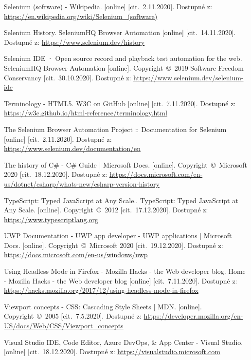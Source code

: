 \begin{thebibliography}{99}
 Selenium (software) - Wikipedia. [online] [cit.~2.11.2020]. Dostupné z: \url{https://en.wikipedia.org/wiki/Selenium_(software)}

 Selenium History. SeleniumHQ Browser Automation [online] [cit.~14.11.2020]. Dostupné z: \url{https://www.selenium.dev/history}

 Selenium IDE · Open source record and playback test automation for the web. SeleniumHQ Browser Automation [online]. Copyright~©~2019 Software Freedom Conservancy [cit.~30.10.2020]. Dostupné z: \url{https://www.selenium.dev/selenium-ide}

 Terminology - HTML5. W3C on GitHub [online] [cit.~7.11.2020]. Dostupné z: \url{https://w3c.github.io/html-reference/terminology.html}

 The Selenium Browser Automation Project :: Documentation for Selenium [online] [cit.~2.11.2020]. Dostupné z: \url{https://www.selenium.dev/documentation/en}

 The history of C\# - C\# Guide | Microsoft Docs. [online]. Copyright~©~Microsoft 2020 [cit.~18.12.2020]. Dostupné z: \url{https://docs.microsoft.com/en-us/dotnet/csharp/whats-new/csharp-version-history}

 TypeScript: Typed JavaScript at Any Scale.. TypeScript: Typed JavaScript at Any Scale. [online]. Copyright~©~2012 [cit.~17.12.2020]. Dostupné z: \url{https://www.typescriptlang.org}

 UWP Documentation - UWP app developer - UWP applications | Microsoft Docs. [online]. Copyright~©~Microsoft 2020 [cit.~19.12.2020]. Dostupné z: \url{https://docs.microsoft.com/en-us/windows/uwp}

 Using Headless Mode in Firefox - Mozilla Hacks - the Web developer blog. Home - Mozilla Hacks - the Web developer blog [online] [cit.~7.11.2020]. Dostupné z: \url{https://hacks.mozilla.org/2017/12/using-headless-mode-in-firefox}

 Viewport concepts - CSS: Cascading Style Sheets | MDN. [online]. Copyright~©~2005 [cit.~7.5.2020]. Dostupné z: \url{https://developer.mozilla.org/en-US/docs/Web/CSS/Viewport_concepts}

 Visual Studio IDE, Code Editor, Azure DevOps, \& App Center - Visual Studio. [online] [cit.~18.12.2020]. Dostupné z: \url{https://visualstudio.microsoft.com}


\end{thebibliography}
